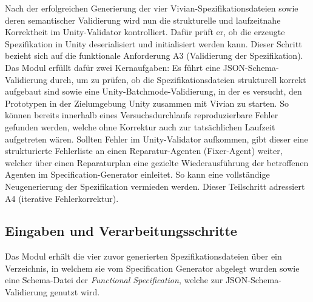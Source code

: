 Nach der erfolgreichen Generierung der vier Vivian-Spezifikationsdateien sowie deren semantischer Validierung wird nun die strukturelle und laufzeitnahe Korrektheit im Unity-Validator kontrolliert. Dafür prüft er, ob die erzeugte Spezifikation in Unity deserialisiert und initialisiert werden kann. Dieser Schritt bezieht sich auf die funktionale Anforderung A3 (Validierung der Spezifikation). Das Modul erfüllt dafür zwei Kernaufgaben: Es führt eine JSON-Schema-Validierung durch, um zu prüfen, ob die Spezifikationsdateien strukturell korrekt aufgebaut sind sowie eine Unity-Batchmode-Validierung, in der es versucht, den Prototypen in der Zielumgebung Unity zusammen mit Vivian zu starten. So können bereits innerhalb eines Versuchsdurchlaufs reproduzierbare Fehler gefunden werden, welche ohne Korrektur auch zur tatsächlichen Laufzeit aufgetreten wären. Sollten Fehler im Unity-Validator aufkommen, gibt dieser eine strukturierte Fehlerliste an einen Reparatur-Agenten (Fixer-Agent) weiter, welcher über einen Reparaturplan eine gezielte Wiederausführung der betroffenen Agenten im Specification-Generator einleitet. So kann eine vollständige Neugenerierung der Spezifikation vermieden werden. Dieser Teilschritt adressiert A4 (iterative Fehlerkorrektur).

\subsection*{Eingaben und Verarbeitungsschritte}

Das Modul erhält die vier zuvor generierten Spezifikationsdateien über ein Verzeichnis, in welchem sie vom Specification Generator abgelegt wurden sowie eine Schema-Datei der \textit{Functional Specification}, welche zur JSON-Schema-Validierung genutzt wird.

